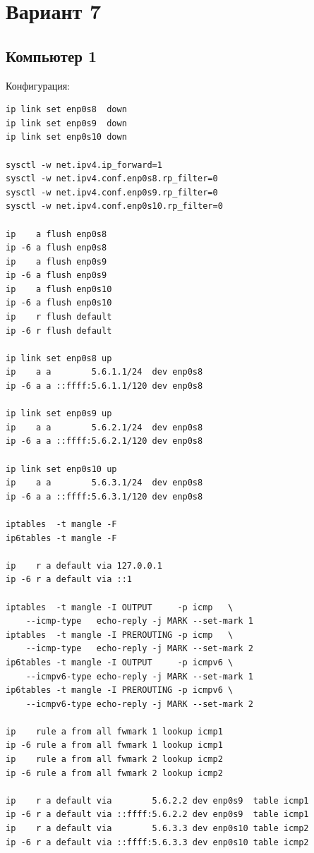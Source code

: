 
\newpage

\section{Вариант 7}

\subsection{Компьютер 1}
Конфигурация:
\begin{verbatim}
ip link set enp0s8  down
ip link set enp0s9  down
ip link set enp0s10 down

sysctl -w net.ipv4.ip_forward=1
sysctl -w net.ipv4.conf.enp0s8.rp_filter=0
sysctl -w net.ipv4.conf.enp0s9.rp_filter=0
sysctl -w net.ipv4.conf.enp0s10.rp_filter=0

ip    a flush enp0s8
ip -6 a flush enp0s8
ip    a flush enp0s9
ip -6 a flush enp0s9
ip    a flush enp0s10
ip -6 a flush enp0s10
ip    r flush default
ip -6 r flush default

ip link set enp0s8 up
ip    a a        5.6.1.1/24  dev enp0s8
ip -6 a a ::ffff:5.6.1.1/120 dev enp0s8

ip link set enp0s9 up
ip    a a        5.6.2.1/24  dev enp0s8
ip -6 a a ::ffff:5.6.2.1/120 dev enp0s8

ip link set enp0s10 up
ip    a a        5.6.3.1/24  dev enp0s8
ip -6 a a ::ffff:5.6.3.1/120 dev enp0s8

iptables  -t mangle -F
ip6tables -t mangle -F

ip    r a default via 127.0.0.1
ip -6 r a default via ::1

iptables  -t mangle -I OUTPUT     -p icmp   \
    --icmp-type   echo-reply -j MARK --set-mark 1
iptables  -t mangle -I PREROUTING -p icmp   \
    --icmp-type   echo-reply -j MARK --set-mark 2
ip6tables -t mangle -I OUTPUT     -p icmpv6 \
    --icmpv6-type echo-reply -j MARK --set-mark 1
ip6tables -t mangle -I PREROUTING -p icmpv6 \
    --icmpv6-type echo-reply -j MARK --set-mark 2

ip    rule a from all fwmark 1 lookup icmp1
ip -6 rule a from all fwmark 1 lookup icmp1
ip    rule a from all fwmark 2 lookup icmp2
ip -6 rule a from all fwmark 2 lookup icmp2

ip    r a default via        5.6.2.2 dev enp0s9  table icmp1
ip -6 r a default via ::ffff:5.6.2.2 dev enp0s9  table icmp1
ip    r a default via        5.6.3.3 dev enp0s10 table icmp2
ip -6 r a default via ::ffff:5.6.3.3 dev enp0s10 table icmp2
\end{verbatim}

